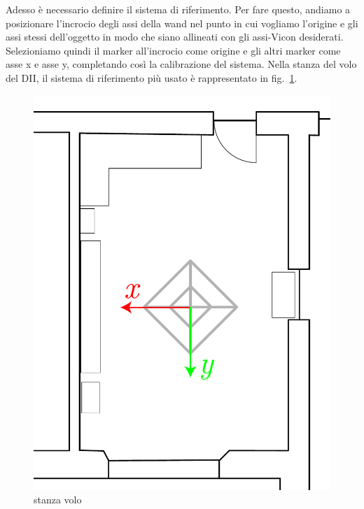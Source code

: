 Adesso è necessario definire il sistema di riferimento. Per fare questo, andiamo a posizionare l'incrocio degli assi della wand nel punto in cui vogliamo 
l'origine e gli assi stessi dell'oggetto in modo che siano allineati con gli assi-Vicon desiderati.
Selezioniamo quindi il marker all'incrocio come origine e gli altri marker come asse x e asse y, completando così la calibrazione del sistema. 
Nella stanza del volo del DII, il sistema di riferimento più usato è rappresentato in fig.~\ref{fig: stanza volo Vicon frame}.

\begin{figure}[] 
	\centering    
	\includegraphics[height=.4\textheight]{stanza_volo.pdf}
	\caption{stanza volo}
	\label{fig: stanza volo Vicon frame}
\end{figure}


\newpage

